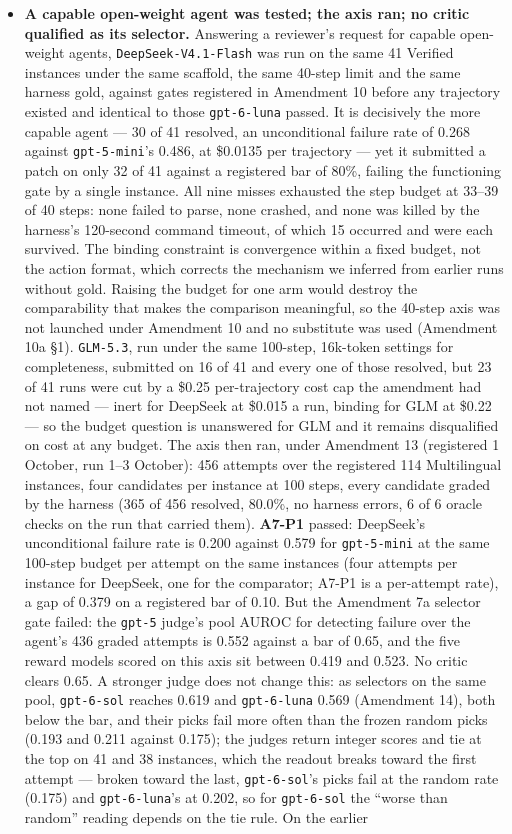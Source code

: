 \documentclass[11pt]{article}
\begin{document}
\begin{itemize}[leftmargin=1.2em,itemsep=1pt]
\item \textbf{A capable open-weight agent was tested; the axis ran; no critic qualified as its selector.} Answering a reviewer's request for capable open-weight agents, \texttt{DeepSeek-V4.1-Flash} was run on the same 41 Verified instances under the same scaffold, the same 40-step limit and the same harness gold, against gates registered in Amendment 10 before any trajectory existed and identical to those \texttt{gpt-6-luna} passed. It is decisively the more capable agent --- 30 of 41 resolved, an unconditional failure rate of 0.268 against \texttt{gpt-5-mini}'s 0.486, at \$0.0135 per trajectory --- yet it submitted a patch on only 32 of 41 against a registered bar of 80\%, failing the functioning gate by a single instance. All nine misses exhausted the step budget at 33--39 of 40 steps: none failed to parse, none crashed, and none was killed by the harness's 120-second command timeout, of which 15 occurred and were each survived. The binding constraint is convergence within a fixed budget, not the action format, which corrects the mechanism we inferred from earlier runs without gold. Raising the budget for one arm would destroy the comparability that makes the comparison meaningful, so the 40-step axis was not launched under Amendment 10 and no substitute was used (Amendment 10a \S1). \texttt{GLM-5.3}, run under the same 100-step, 16k-token settings for completeness, submitted on 16 of 41 and every one of those resolved, but 23 of 41 runs were cut by a \$0.25 per-trajectory cost cap the amendment had not named --- inert for DeepSeek at \$0.015 a run, binding for GLM at \$0.22 --- so the budget question is unanswered for GLM and it remains disqualified on cost at any budget. The axis then ran, under Amendment 13 (registered 1 October, run 1--3 October): 456 attempts over the registered 114 Multilingual instances, four candidates per instance at 100 steps, every candidate graded by the harness (365 of 456 resolved, 80.0\%, no harness errors, 6 of 6 oracle checks on the run that carried them). \textbf{A7-P1} passed: DeepSeek's unconditional failure rate is 0.200 against 0.579 for \texttt{gpt-5-mini} at the same 100-step budget per attempt on the same instances (four attempts per instance for DeepSeek, one for the comparator; A7-P1 is a per-attempt rate), a gap of 0.379 on a registered bar of 0.10. But the Amendment 7a selector gate failed: the \texttt{gpt-5} judge's pool AUROC for detecting failure over the agent's 436 graded attempts is 0.552 against a bar of 0.65, and the five reward models scored on this axis sit between 0.419 and 0.523. No critic clears 0.65. A stronger judge does not change this: as selectors on the same pool, \texttt{gpt-6-sol} reaches 0.619 and \texttt{gpt-6-luna} 0.569 (Amendment 14), both below the bar, and their picks fail more often than the frozen random picks (0.193 and 0.211 against 0.175); the judges return integer scores and tie at the top on 41 and 38 instances, which the readout breaks toward the first attempt --- broken toward the last, \texttt{gpt-6-sol}'s picks fail at the random rate (0.175) and \texttt{gpt-6-luna}'s at 0.202, so for \texttt{gpt-6-sol} the ``worse than random'' reading depends on the tie rule. On the earlier 
\end{itemize}
\end{document}
